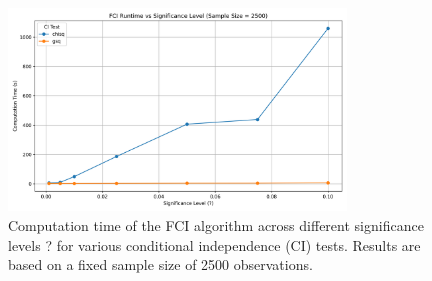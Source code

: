 \begin{figure}[htbp]
    \centering
    \includegraphics[width=0.8\textwidth]{Report/final_report/pictures/fci_runtime_vs_alpha.png}
    \caption{Computation time of the FCI algorithm across different significance levels ? for various conditional independence (CI) tests. Results are based on a fixed sample size of 2500 observations.}
    \label{fig:fci_runtime_vs_alpha}
\end{figure}
